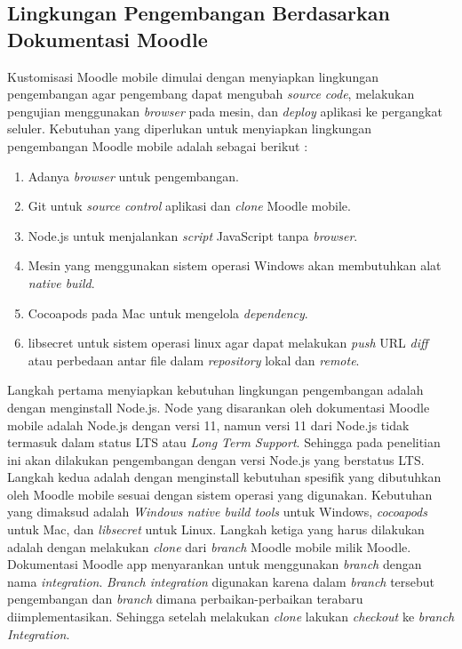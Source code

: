 \subsection{Lingkungan Pengembangan Berdasarkan Dokumentasi Moodle}
Kustomisasi Moodle mobile dimulai dengan menyiapkan lingkungan pengembangan agar pengembang dapat mengubah \textit{source code}, melakukan pengujian menggunakan \textit{browser} pada mesin, dan \textit{deploy} aplikasi ke pergangkat seluler. Kebutuhan yang diperlukan untuk menyiapkan lingkungan pengembangan Moodle mobile adalah sebagai berikut : \cite{moodle:dev}


\begin{enumerate}
	\item Adanya \textit{browser} untuk pengembangan.
	\item Git untuk \textit{source control} aplikasi dan \textit{clone} Moodle mobile.
	\item Node.js untuk menjalankan \textit{script} JavaScript tanpa \textit{browser}.
	\item Mesin yang menggunakan sistem operasi Windows akan membutuhkan alat \textit{native build}.
	\item Cocoapods pada Mac untuk mengelola \textit{dependency}.
	\item libsecret untuk sistem operasi linux agar dapat melakukan \textit{push} URL \textit{diff} atau perbedaan antar file dalam \textit{repository} lokal dan \textit{remote}.
	
\end{enumerate}

Langkah pertama menyiapkan kebutuhan lingkungan pengembangan adalah dengan menginstall Node.js. Node yang disarankan oleh dokumentasi Moodle mobile adalah Node.js dengan versi 11\cite{moodle:dev}, namun versi 11 dari Node.js tidak termasuk dalam status LTS atau \textit{Long Term Support}\cite{nodejs:status}. Sehingga pada penelitian ini akan dilakukan pengembangan dengan versi Node.js yang berstatus LTS. Langkah kedua adalah dengan menginstall kebutuhan spesifik yang dibutuhkan oleh Moodle mobile sesuai dengan sistem operasi yang digunakan. Kebutuhan yang dimaksud adalah \textit{Windows native build tools} untuk Windows, \textit{cocoapods} untuk Mac, dan \textit{libsecret} untuk Linux. Langkah ketiga yang harus dilakukan adalah dengan melakukan \textit{clone} dari \textit{branch} Moodle mobile milik Moodle. Dokumentasi Moodle app menyarankan untuk menggunakan \textit{branch} dengan nama \textit{integration}\cite{moodle:dev}. \textit{Branch integration} digunakan karena dalam \textit{branch} tersebut pengembangan dan \textit{branch} dimana perbaikan-perbaikan terabaru diimplementasikan. Sehingga setelah melakukan \textit{clone} lakukan \textit{checkout} ke \textit{branch Integration}.


